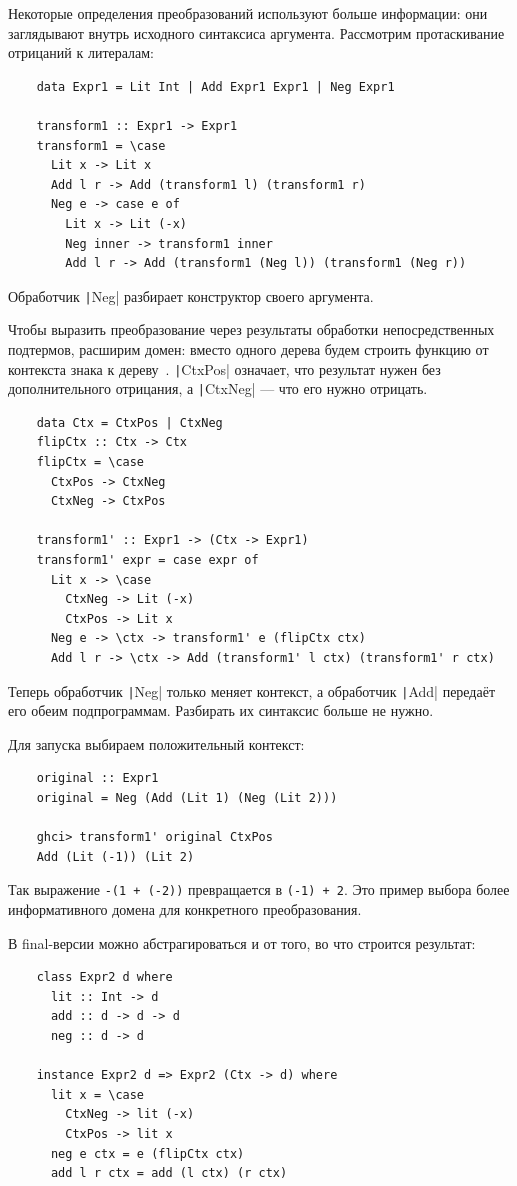 Некоторые определения преобразований используют больше информации: они заглядывают внутрь исходного синтаксиса аргумента.
Рассмотрим протаскивание отрицаний к литералам:
\begin{verbatim}
    data Expr1 = Lit Int | Add Expr1 Expr1 | Neg Expr1

    transform1 :: Expr1 -> Expr1
    transform1 = \case
      Lit x -> Lit x
      Add l r -> Add (transform1 l) (transform1 r)
      Neg e -> case e of
        Lit x -> Lit (-x)
        Neg inner -> transform1 inner
        Add l r -> Add (transform1 (Neg l)) (transform1 (Neg r))
\end{verbatim}
Обработчик \texttt|Neg| разбирает конструктор своего аргумента.

Чтобы выразить преобразование через результаты обработки непосредственных подтермов, расширим домен: вместо одного дерева будем строить функцию от контекста знака к дереву~\cite{kiselyov2012typed}.
\texttt|CtxPos| означает, что результат нужен без дополнительного отрицания, а \texttt|CtxNeg| --- что его нужно отрицать.
\begin{verbatim}
    data Ctx = CtxPos | CtxNeg
    flipCtx :: Ctx -> Ctx
    flipCtx = \case
      CtxPos -> CtxNeg
      CtxNeg -> CtxPos

    transform1' :: Expr1 -> (Ctx -> Expr1)
    transform1' expr = case expr of
      Lit x -> \case
        CtxNeg -> Lit (-x)
        CtxPos -> Lit x
      Neg e -> \ctx -> transform1' e (flipCtx ctx)
      Add l r -> \ctx -> Add (transform1' l ctx) (transform1' r ctx)
\end{verbatim}
Теперь обработчик \texttt|Neg| только меняет контекст, а обработчик \texttt|Add| передаёт его обеим подпрограммам.
Разбирать их синтаксис больше не нужно.

Для запуска выбираем положительный контекст:
\begin{verbatim}
    original :: Expr1
    original = Neg (Add (Lit 1) (Neg (Lit 2)))

    ghci> transform1' original CtxPos
    Add (Lit (-1)) (Lit 2)
\end{verbatim}
Так выражение \texttt{-(1 + (-2))} превращается в \texttt{(-1) + 2}.
Это пример выбора более информативного домена для конкретного преобразования.

В final-версии можно абстрагироваться и от того, во что строится результат:
\begin{verbatim}
    class Expr2 d where
      lit :: Int -> d
      add :: d -> d -> d
      neg :: d -> d

    instance Expr2 d => Expr2 (Ctx -> d) where
      lit x = \case
        CtxNeg -> lit (-x)
        CtxPos -> lit x
      neg e ctx = e (flipCtx ctx)
      add l r ctx = add (l ctx) (r ctx)
\end{verbatim}

